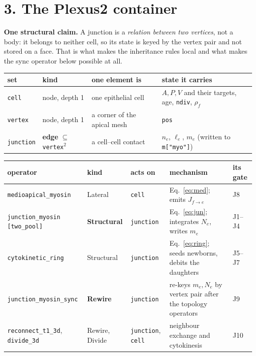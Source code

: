 \documentclass[10pt,a4paper]{article}
\newcommand{\code}[1]{\texttt{#1}}
\newcommand{\op}[1]{\texttt{#1}}
\begin{document}
\section*{3.\; The Plexus2 container}

\textbf{One structural claim.} A junction is a \emph{relation between two vertices}, not a body: it
belongs to neither cell, so its state is keyed by the vertex pair and not stored on a face. That is
what makes the inheritance rules local and what makes the sync operator below possible at all.

\begin{center}\small
\begin{tabular}{@{}llll@{}}\toprule
\textbf{set} & \textbf{kind} & \textbf{one element is} & \textbf{state it carries}\\\midrule
\code{cell}    & node, depth 1 & one epithelial cell & $A,P,V$ and their targets, age, \code{ndiv},
  $\rho_f$\\
\code{vertex}  & node, depth 1 & a corner of the apical mesh & \code{pos}\\
\code{junction}& \textbf{edge} $\subseteq$ \code{vertex}$^2$ & a cell--cell contact & $n_e$, $\ell_e$,
  $m_e$ (written to \code{m["myo"]})\\
\bottomrule\end{tabular}
\end{center}

\begin{center}\footnotesize
\begin{tabular}{@{}lllp{4.4cm}p{3.1cm}@{}}\toprule
\textbf{operator} & \textbf{kind} & \textbf{acts on} & \textbf{mechanism} & \textbf{its gate}\\\midrule
\op{medioapical\_myosin} & Lateral & \code{cell} & Eq.~\eqref{eq:med}; emits $J_{f\to e}$ & J8\\
\op{junction\_myosin} \code{[two\_pool]} & \textbf{Structural} & \code{junction} &
  Eq.~\eqref{eq:jun}; integrates $N_e$, writes $m_e$ & J1--J4\\
\op{cytokinetic\_ring}   & Structural & \code{junction} & Eq.~\eqref{eq:ring}; seeds newborns, debits
  the daughters & J5--J7\\
\op{junction\_myosin\_sync} & \textbf{Rewire} & \code{junction} & re-keys $m_e,N_e$ by vertex pair
  after the topology operators & J9\\
\op{reconnect\_t1\_3d}, \op{divide\_3d} & Rewire, Divide & \code{junction}, \code{cell} & neighbour
  exchange and cytokinesis \cite{okuda2013} & J10\\
\bottomrule\end{tabular}
\end{center}
\end{document}
